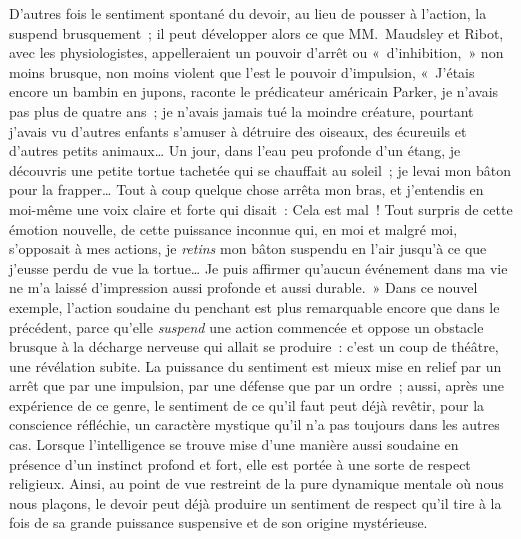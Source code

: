 \documentclass[french,twoside]{book} %
\begin{document}
D’autres fois le sentiment spontané du devoir, au lieu de pousser à l’action, la suspend brusquement ; il peut développer alors ce que MM. Maudsley et Ribot, avec les physiologistes, appelleraient un pouvoir d’arrêt ou « d’inhibition, » non moins brusque, non moins violent que l’est le pouvoir d’impulsion, « J’étais encore un bambin en jupons, raconte le prédicateur américain Parker, je n’avais pas plus de quatre ans ; je n’avais jamais tué la moindre créature, pourtant j’avais vu d’autres enfants s’amuser à détruire des oiseaux, des écureuils et d’autres petits animaux… Un jour, dans l’eau peu profonde d’un étang, je découvris une petite tortue tachetée qui se chauffait au soleil ; je levai mon bâton pour la frapper… Tout à coup quelque chose arrêta mon bras, et j’entendis en moi-même une voix claire et forte qui disait : Cela est mal ! Tout surpris de cette émotion nouvelle, de cette puissance inconnue qui, en moi et malgré moi, s’opposait à mes actions, je \emph{retins} mon bâton suspendu en l’air jusqu’à ce que j’eusse perdu de vue la tortue… Je puis affirmer qu’aucun événement dans ma vie ne m’a laissé d’impression aussi profonde et aussi durable. » Dans ce nouvel exemple, l’action soudaine du penchant est plus remarquable encore que dans le précédent, parce qu’elle \emph{suspend} une action commencée et oppose un obstacle brusque à la décharge nerveuse qui allait se produire : c’est un coup de théâtre, une révélation subite. La puissance du sentiment est mieux mise en relief par un arrêt que par une impulsion, par une défense que par un ordre ; aussi, après une expérience de ce genre, le sentiment de ce qu’il faut peut déjà revêtir, pour la conscience réfléchie, un caractère mystique qu’il n’a pas toujours dans les autres cas. Lorsque l’intelligence se trouve mise d’une manière aussi soudaine en présence d’un instinct profond et fort, elle est portée à une sorte de respect religieux. Ainsi, au point de vue restreint de la pure dynamique mentale où nous nous plaçons, le devoir peut déjà produire un sentiment de respect qu’il tire à la fois de sa grande puissance suspensive et de son origine mystérieuse.\par
\end{document}
